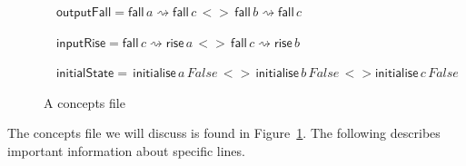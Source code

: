 \documentclass{proc}
\begin{document}
\begin{figure}[H]
\begin{centering}
\begin{flushleft}
$\,\,\,\,\,\,\mathsf{outputFall}=\mathsf{fall} \,a \rightsquigarrow \mathsf{fall} \,c \,<>\, \mathsf{fall} \,b \rightsquigarrow \mathsf{fall} \,c$
\par\end{flushleft}

\begin{flushleft}
$\,\,\,\,\,\,\mathsf{inputRise}=\mathsf{fall} \,c \rightsquigarrow \mathsf{rise} \,a \,<>\, \mathsf{fall} \,c\rightsquigarrow \mathsf{rise} \,b$
\par\end{flushleft}

\begin{flushleft}
$\,\,\,\,\,\,\mathsf{initialState}= \, \mathsf{initialise}\,a \, False\,<>\,\mathsf{initialise}\,b \,False\,<> \mathsf{initialise}\,c \,False \,$
\par\end{flushleft}

\par\end{centering}

\begin{centering}
\protect\caption{\label{fig:concepts_file}A concepts file}

\par\end{centering}

\end{figure}

The concepts file we will discuss is found in Figure~\ref{fig:concepts_file}. The following describes important information about specific lines.
\end{document}
